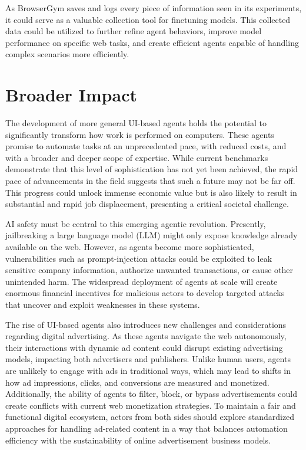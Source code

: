 \documentclass[10pt]{article} %
\begin{document}
As BrowserGym saves and logs every piece of information seen in its experiments, it could serve as a valuable collection tool for finetuning models. This collected data could be utilized to further refine agent behaviors, improve model performance on specific web tasks, and create efficient agents capable of handling complex scenarios more efficiently.


\section{Broader Impact}

The development of more general UI-based agents holds the potential to significantly transform how work is performed on computers. These agents promise to automate tasks at an unprecedented pace, with reduced costs, and with a broader and deeper scope of expertise. While current benchmarks demonstrate that this level of sophistication has not yet been achieved, the rapid pace of advancements in the field suggests that such a future may not be far off. This progress could unlock immense economic value but is also likely to result in substantial and rapid job displacement, presenting a critical societal challenge.

AI safety must be central to this emerging agentic revolution. Presently, jailbreaking a large language model (LLM) might only expose knowledge already available on the web. However, as agents become more sophisticated, vulnerabilities such as prompt-injection attacks could be exploited to leak sensitive company information, authorize unwanted transactions, or cause other unintended harm. The widespread deployment of agents at scale will create enormous financial incentives for malicious actors to develop targeted attacks that uncover and exploit weaknesses in these systems.

The rise of UI-based agents also introduces new challenges and considerations regarding digital advertising. As these agents navigate the web autonomously, their interactions with dynamic ad content could disrupt existing advertising models, impacting both advertisers and publishers. Unlike human users, agents are unlikely to engage with ads in traditional ways, which may lead to shifts in how ad impressions, clicks, and conversions are measured and monetized. Additionally, the ability of agents to filter, block, or bypass advertisements could create conflicts with current web monetization strategies. To maintain a fair and functional digital ecosystem, actors from both sides should explore standardized approaches for handling ad-related content in a way that balances automation efficiency with the sustainability of online advertisement business models.
\end{document}

